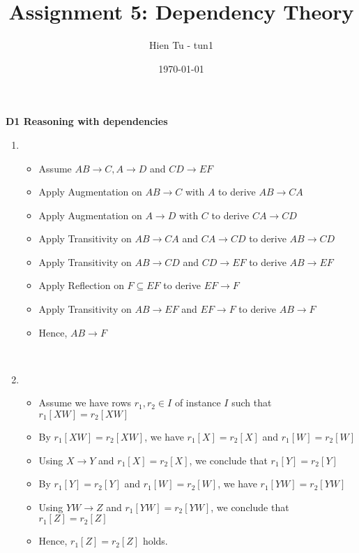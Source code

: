 \documentclass[12pt]{article}
\title{Assignment 5: Dependency Theory}
\author{Hien Tu - tun1}
\date{\today}
\begin{document}
\maketitle

\textbf{D1 Reasoning with dependencies}

\begin{enumerate}
  \item
    \begin{itemize}
      \item Assume $AB \longrightarrow C, A \longrightarrow D$ and $CD
            \longrightarrow EF$
      \item Apply Augmentation on $AB \longrightarrow C$ with $A$ to derive $AB
            \longrightarrow CA$
      \item Apply Augmentation on $A \longrightarrow D$ with $C$ to derive $CA
            \longrightarrow CD$
      \item Apply Transitivity on $AB \longrightarrow CA$ and $CA
            \longrightarrow CD$ to derive $AB \longrightarrow CD$
      \item Apply Transitivity on $AB \longrightarrow CD$ and $CD
            \longrightarrow EF$ to derive $AB \longrightarrow EF$
      \item Apply Reflection on $F \subseteq EF$ to derive $EF \longrightarrow
            F$
      \item Apply Transitivity on $AB \longrightarrow EF$ and $EF
            \longrightarrow F$ to derive $AB \longrightarrow F$
      \item Hence, $AB \longrightarrow F$
    \end{itemize}
    \ \\

  \item
    \begin{itemize}
      \item Assume we have rows $r_1, r_2 \in I$ of instance $I$ such that
            $r_1[XW] = r_2[XW]$
      \item By $r_1[XW] = r_2[XW]$, we have $r_1[X] = r_2[X]$ and $r_1[W] =
            r_2[W]$
      \item Using $X \longrightarrow Y$ and $r_1[X] = r_2[X]$, we conclude that
            $r_1[Y] = r_2[Y]$
      \item By $r_1[Y] = r_2[Y]$ and $r_1[W] = r_2[W]$, we have $r_1[YW] =
            r_2[YW]$
      \item Using $YW \longrightarrow Z$ and $r_1[YW] = r_2[YW]$, we conclude
            that $r_1[Z] = r_2[Z]$
      \item Hence, $r_1[Z] = r_2[Z]$ holds.
    \end{itemize}
  \ \\


\end{enumerate}
\end{document}
